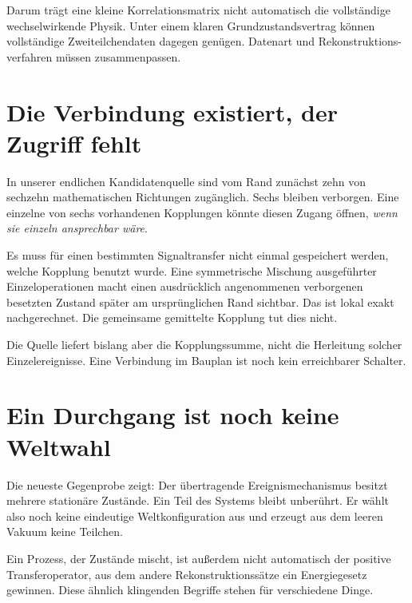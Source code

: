 \documentclass[10pt,a4paper]{article}
\begin{document}
Darum trägt eine kleine Korrelationsmatrix nicht automatisch die vollständige
wechselwirkende Physik. Unter einem klaren Grundzustandsvertrag können
vollständige Zweiteilchendaten dagegen genügen. Datenart und Rekonstruktions-
verfahren müssen zusammenpassen.

\section*{Die Verbindung existiert, der Zugriff fehlt}
In unserer endlichen Kandidatenquelle sind vom Rand zunächst zehn von
sechzehn mathematischen Richtungen zugänglich. Sechs bleiben verborgen.
Eine einzelne von sechs vorhandenen Kopplungen könnte diesen Zugang öffnen,
\emph{wenn sie einzeln ansprechbar wäre}.

Es muss für einen bestimmten Signaltransfer nicht einmal gespeichert werden,
welche Kopplung benutzt wurde. Eine symmetrische Mischung ausgeführter
Einzeloperationen macht einen ausdrücklich angenommenen verborgenen
besetzten Zustand später am ursprünglichen Rand sichtbar. Das ist lokal
exakt nachgerechnet. Die gemeinsame gemittelte Kopplung tut dies nicht.

Die Quelle liefert bislang aber die Kopplungssumme, nicht die Herleitung
solcher Einzelereignisse. Eine Verbindung im Bauplan ist noch kein
erreichbarer Schalter.

\section*{Ein Durchgang ist noch keine Weltwahl}
Die neueste Gegenprobe zeigt: Der übertragende Ereignismechanismus besitzt
mehrere stationäre Zustände. Ein Teil des Systems bleibt unberührt. Er
wählt also noch keine eindeutige Weltkonfiguration aus und erzeugt aus dem
leeren Vakuum keine Teilchen.

Ein Prozess, der Zustände mischt, ist außerdem nicht automatisch der positive
Transferoperator, aus dem andere Rekonstruktionssätze ein Energiegesetz
gewinnen. Diese ähnlich klingenden Begriffe stehen für verschiedene Dinge.
\end{document}
